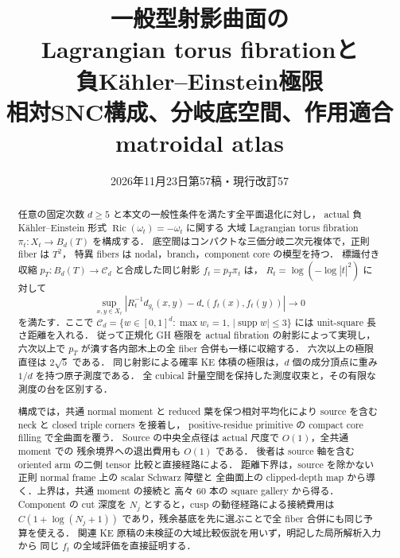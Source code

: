 \documentclass[11pt,a4paper]{article}
\title{一般型射影曲面の\\Lagrangian torus fibrationと\\負Kähler--Einstein極限\\[0.5em]\large 相対SNC構成、分岐底空間、作用適合matroidal atlas}
\author{}
\date{2026年11月23日\quad 第57稿・現行改訂57}
\begin{document}
\maketitle
\begin{abstract}
任意の固定次数 $d\ge5$ と本文の一般性条件を満たす全平面退化に対し，
actual 負 Kähler--Einstein 形式 $\operatorname{Ric}(\omega_t)=-\omega_t$ に関する
大域 Lagrangian torus fibration
$\pi_t:X_t\to B_d(T)$ を構成する．
底空間はコンパクトな三価分岐二次元複体で，正則 fiber は $T^2$，
特異 fibers は nodal，branch，component core の模型を持つ．
標識付き収縮 $p_T:B_d(T)\to\mathcal C_d$ と合成した同じ射影 $f_t=p_T\pi_t$ は，
$R_t=\log(-\log|t|^2)$ に対して
\[
 \sup_{x,y\in X_t}
 \left|R_t^{-1}d_{g_t}(x,y)-d_\square(f_t(x),f_t(y))\right|\longrightarrow0
\]
を満たす．ここで $\mathcal C_d=\{w\in[0,1]^d:\max w_i=1,\,
|\operatorname{supp}w|\le3\}$ には unit-square 長さ距離を入れる．
従って正規化 GH 極限を actual fibration の射影によって実現し，
六次以上で $p_T$ が潰す各内部木上の全 fiber 合併も一様に収縮する．
六次以上の極限直径は $2\sqrt5$ である．
同じ射影による確率 KE 体積の極限は，$d$ 個の成分頂点に重み $1/d$ を持つ原子測度である．
全 cubical 計量空間を保持した測度収束と，その有限な測度の台を区別する．

構成では，共通 normal moment と reduced 葉を保つ相対平均化により
source を含む neck と closed triple corners を接着し，
positive-residue primitive の compact core filling で全曲面を覆う．
Source の中央全点径は actual 尺度で $O(1)$，全共通 moment での
残余境界への退出費用も $O(1)$ である．
後者は source 軸を含む oriented arm の二側 tensor 比較と直接経路による．
距離下界は，source を除かない正則 normal frame 上の scalar Schwarz 障壁と
全曲面上の clipped-depth map から導く．上界は，共通 moment の接続と
高々 $60$ 本の square gallery から得る．
Component の cut 深度を $N_j$ とすると，cusp の動径経路による接続費用は
$C(1+\log(N_j+1))$ であり，残余基底を先に選ぶことで全 fiber 合併にも同じ予算を使える．
関連 KE 原稿の未検証の大域比較仮説を用いず，明記した局所解析入力から
同じ $f_t$ の全域評価を直接証明する．


\end{abstract}
\end{document}

